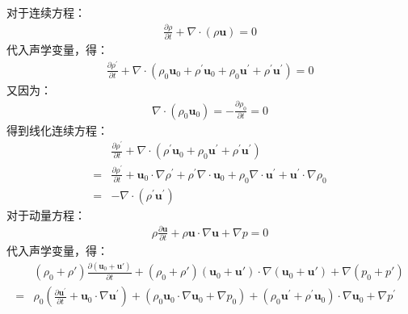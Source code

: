 \begin{enumerate}
        对于连续方程：
        \begin{gather}
            \frac{\partial \rho}{\partial t}+\nabla \cdot(\rho \mathbf{u})=0
        \end{gather}
        代入声学变量，得：
        \begin{gather}
            \frac{\partial \rho^{\prime}}{\partial t}+\nabla \cdot\left(\rho_{0} \mathbf{u}_{0}+\rho^{\prime} \mathbf{u}_{0}+\rho_{0} \mathbf{u}^{\prime}+\rho^{\prime} \mathbf{u}^{\prime}\right)=0
        \end{gather}
        又因为：
        \begin{gather}
            \nabla \cdot\left(\rho_{0} \mathbf{u}_{0}\right) = - \frac{\partial \rho_{0}}{\partial t} = 0
        \end{gather}
        得到线化连续方程：
        \begin{equation}
            \begin{aligned}
                & \frac{\partial \rho^{\prime}}{\partial t}+\nabla \cdot\left(\rho^{\prime} \mathbf{u}_{0}+\rho_{0} \mathbf{u}^{\prime}+\rho^{\prime} \mathbf{u}^{\prime}\right) \\
                =& \frac{\partial \rho^{\prime}}{\partial t}+\mathbf{u}_{0} \cdot \nabla \rho^{\prime}+\rho^{\prime} \nabla \cdot \mathbf{u}_{0}+\rho_{0} \nabla \cdot \mathbf{u}^{\prime}+\mathbf{u}^{\prime} \cdot \nabla \rho_{0} \\
                =& -\nabla \cdot\left(\rho^{\prime} \mathbf{u}^{\prime}\right) 
            \end{aligned}        
        \end{equation}
        对于动量方程：
        \begin{gather}
            \rho \frac{\partial \mathbf{u}}{\partial t}+\rho \mathbf{u} \cdot \nabla \mathbf{u}+\nabla p=0
        \end{gather}
        代入声学变量，得：
        \begin{equation}
            \begin{aligned}
                & (\rho_{0} + \rho \prime) \frac{\partial (\boldsymbol{u}_{0}+ \boldsymbol{u} \prime) }{\partial t}+(\rho_{0} + \rho \prime) (\boldsymbol{u}_{0} + \boldsymbol{u} \prime ) \cdot \nabla (\boldsymbol{u}_{0} + \boldsymbol{u} \prime )+\nabla (p_{0}  + p \prime ) \\
                =& \rho_{0}\left(\frac{\partial \mathbf{u}^{\prime}}{\partial t}+\mathbf{u}_{0} \cdot \nabla \mathbf{u}^{\prime}\right)+\left(\rho_{0} \mathbf{u}_{0} \cdot \nabla \mathbf{u}_{0}+\nabla p_{0}\right)+\left(\rho_{0} \mathbf{u}^{\prime}+\rho^{\prime} \mathbf{u}_{0}\right) \cdot \nabla \mathbf{u}_{0}+\nabla p^{\prime} \\

\end{aligned}
\end{equation}
\end{enumerate}
